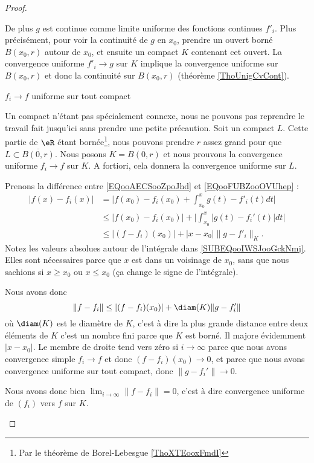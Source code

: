 \begin{proof}
\begin{subproof}
    De plus \( g\) est continue comme limite uniforme des fonctions continues \( f'_i\). Plus précisément, pour voir la continuité de \( g\) en \( x_0\), prendre un ouvert borné \( B(x_0,r)\) autour de \( x_0\), et ensuite un compact \( K\) contenant cet ouvert. La convergence uniforme \( f'_i\to g\) sur \( K\) implique la convergence uniforme sur \( B(x_0,r)\) et donc la continuité sur \( B(x_0,r)\) (théorème \ref{ThoUnigCvCont}).

\item[\( f_i\to f\) uniforme sur tout compact]

    Un compact n'étant pas spécialement connexe, nous ne pouvons pas reprendre le travail fait jusqu'ici sans prendre une petite précaution. Soit un compact \( L\). Cette partie de \( \eR\) étant bornée\footnote{Par le théorème de Borel-Lebesgue \ref{ThoXTEooxFmdI}}, nous pouvons prendre \( r\) assez grand pour que \( L\subset \overline{ B(0,r) }\). Nous posons \( K=\overline{ B(0,r) }\) et nous prouvons la convergence uniforme \( f_i\to f\) sur \( K\). A fortiori, cela donnera la convergence uniforme sur \( L\).

    Prenons la différence entre \eqref{EQooAECSooZpoJhd} et \eqref{EQooFUBZooOVUhep} :
    \begin{subequations}
        \begin{align}
            | f(x)-f_i(x) |&=\big| f(x_0)-f_i(x_0)+\int_{x_0}^x g(t)-f'_i(t)dt \big|\\
            &\leq | f(x_0)-f_i(x_0) |+\Big| \int_{x_0}^x| g(t)-f_i'(t) |dt  \Big|       \label{SUBEQooIWSJooGckNmj}\\
            &\leq | (f-f_i)(x_0) |+| x-x_0 |\| g-f'_i \|_K.
        \end{align}
    \end{subequations}
    Notez les valeurs absolues autour de l'intégrale dans \eqref{SUBEQooIWSJooGckNmj}. Elles sont nécessaires parce que \( x\) est dans un voisinage de \( x_0\), sans que nous sachions si \( x\geq x_0\) ou \( x\leq x_0\) (ça change le signe de l'intégrale).

    Nous avons donc
    \begin{equation}
        \| f-f_i \|\leq | (f-f_i)(x_0) |+\diam(K)\| g-f'_i \|
    \end{equation}
    où \( \diam(K)\) est le diamètre de \( K\), c'est à dire la plus grande distance entre deux éléments de \( K\) c'est un nombre fini parce que \( K\) est borné. Il majore évidemment \( | x-x_0 |\). Le membre de droite tend vers zéro si \( i\to \infty\) parce que nous avons convergence simple \( f_i\to f\) et donc \( (f-f_i)(x_0)\to 0\), et parce que nous avons convergence uniforme sur tout compact, donc \( \| g-f_i' \|\to 0\).

    Nous avons donc bien \( \lim_{i\to \infty}\| f-f_i \|=0\), c'est à dire convergence uniforme de \( (f_i)\) vers \( f\) sur \( K\).

    \end{subproof}
\end{proof}

